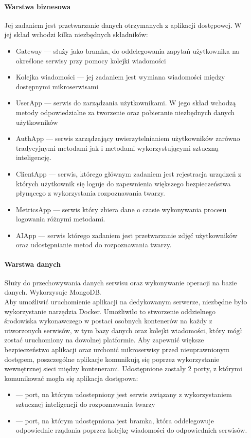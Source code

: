 \paragraph{Warstwa biznesowa} Jej zadaniem jest przetwarzanie danych otrzymanych z aplikacji dostępowej. W jej skład wchodzi kilka niezbędnych składników:
\begin{itemize}
  \item Gateway --- służy jako bramka, do oddelegowania zapytań użytkownika na określone serwisy przy pomocy kolejki wiadomości
  \item Kolejka wiadomości --- jej zadaniem jest wymiana wiadomości między dostępnymi mikroserwisami
  \item UserApp --- serwis do zarządzania użytkownikami. W jego skład wchodzą metody odpowiedzialne za tworzenie oraz pobieranie niezbędnych danych użytkowników
  \item AuthApp --- serwis zarządzający uwierzytelnianiem użytkowników zarówno tradycyjnymi metodami jak i metodami wykorzystującymi sztuczną inteligencję.
  \item ClientApp --- serwis, którego głównym zadaniem jest rejestracja urządzeń z których użytkownik się loguje do zapewnienia większego bezpieczeństwa płynącego z wykorzystania rozpoznawania twarzy.
  \item MetricsApp --- serwis który zbiera dane o czasie wykonywania procesu logowania różnymi metodami.
  \item AIApp --- serwis którego zadaniem jest przetwarzanie zdjęć użytkowników oraz udostępnianie metod do rozpoznawania twarzy.
\end{itemize}

\paragraph{Warstwa danych} Służy do przechowywania danych serwisu oraz wykonywanie operacji na bazie danych. Wykorzysuje MongoDB.
\\
Aby umożliwić uruchomienie aplikacji na dedykowanym serwerze, niezbędne było wykorzystanie narzędzia Docker. Umożliwiło to stworzenie oddzielnego środowiska wykonawczego w postaci osobnych kontenerów na każdy z utworzonych serwisów, w tym bazy danych oraz kolejki wiadomości, który mógł zostać uruchomiony na dowolnej platformie. Aby zapewnić większe bezpieczeństwo aplikacji oraz urchonić mikroserwisy przed nieuprawnionym dostępem, poszczególne aplikacje komunikują się poprzez wykorzystanie wewnętrznej sieci między kontenerami. Udostępnione zostały 2 porty, z którymi komunikować mogła się aplikacja dostępowa:
\begin{itemize}
  \item \emph{} --- port, na którym udostepniony jest serwis związany z wykorzystaniem sztucznej inteligencji do rozpoznawania twarzy
  \item \emph{} --- port, na którym udostępniona jest bramka, która oddelegowuje odpowiednie rządania poprzez kolejkę wiadomości do odpowiednich serwisów.
\end{itemize}

